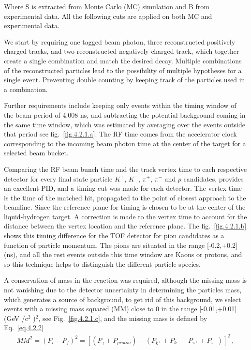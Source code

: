 Where S is extracted from Monte Carlo (MC) simulation and B from experimental data. All the following cuts are applied on both MC and experimental data.
\par We start by requiring one tagged beam photon, three reconstructed positively charged tracks, and two reconstructed negatively charged track, which together create a single combination and match the desired decay. Multiple combinations of the reconstructed particles lead to the possibility of multiple hypotheses for a single event. Preventing double counting by keeping track of the particles used in a combination.
\par Further requirements include keeping only events within the timing window of the beam period of 4.008 ns, and subtracting the potential background coming in the same time window, which was estimated by averaging over the events outside that period see fig.~\ref{fig.4.2.1.a}. The RF time comes from the accelerator clock corresponding to the incoming beam photon time at the center of the target for a selected beam bucket.
\par Comparing the RF beam bunch time and the track vertex time to each respective detector for every final state particle $K^{+}$, $K^{-}$, $\pi^{+}$, $\pi^{-}$ and $p$ candidates, provides an excellent PID, and a timing cut was made for each detector. The vertex time is the time of the matched hit, propagated to the point of closest approach to the beamline. Since the reference plane for timing is chosen to be at the center of the liquid-hydrogen target. A correction is made to the vertex time to account for the distance between the vertex location and the reference plane. The fig.~\ref{fig.4.2.1.b} shows this timing difference for the TOF detector for pion candidates as a function of particle momentum. The pions are situated in the range [-0.2,+0.2] (ns), and all the rest events outside this time window are Kaons or protons, and so this technique helps to distinguish the different particle species.
\par A conservation of mass in the reaction was required, although the missing mass is not vanishing due to the detector uncertainty in determining the particles mass, which generates a source of background, to get rid of this background, we select events with a missing mass squared (MM) close to 0 in the range [-0.01,+0.01] (GeV /c$^2$ )$^2$, see Fig.~\ref{fig.4.2.1.c}, and the missing mass is defined by Eq.~\ref{eq.4.2.2}
\setlength{\belowdisplayskip}{15pt}
\setlength{\abovedisplayskip}{15pt}
\begin{equation}
    \label{eq.4.2.2}
    \begin{aligned}
        MM^2 = (P_i - P_f)^2 = [(P_{\gamma} + P_{proton}) - (P_{k^+} + P_{k^-} + P_{\pi^+} + P_{\pi^-})]^2~,
    \end{aligned}    
\end{equation}

